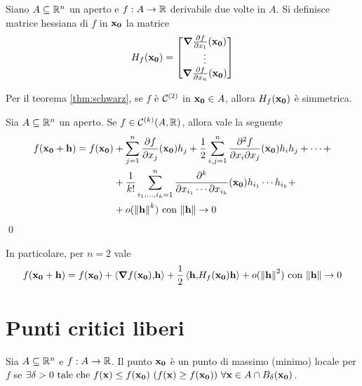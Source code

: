 \begin{definition}
    Siano $A \subseteq \mathbb{R}^n$ un aperto e $f: A \to \mathbb{R}$ derivabile due volte in $A$. Si definisce matrice hessiana di $f$ in $\vb{x_0}$ la matrice
    $$
        H_f(\vb{x_0}) =
        \begin{bmatrix}
            \grad \frac{\partial f}{\partial x_1}(\vb{x_0})\\
            \vdots\\
            \grad \frac{\partial f}{\partial x_n}(\vb{x_0})
        \end{bmatrix}
    $$
\end{definition}

\begin{remark}
    Per il teorema \ref{thm:schwarz}, se $f$ è $\mathcal{C}^{(2)}$ in $\vb{x_0} \in A$, allora $H_f(\vb{x_0})$ è simmetrica.
\end{remark}

\begin{theorem}
    Sia $A \subseteq \mathbb{R}^n$ un aperto. Se $f \in \mathcal{C}^{(k)}(A, \mathbb{R})$, allora vale la seguente
    \begin{align*}
        f(\vb{x_0}+ \vb{h})= f(\vb{x_0})&+\sum_{j=1}^{n}\frac{\partial f}{\partial x_j}(\vb{x_0})h_j + \frac{1}{2}\sum_{i,j=1}^{n}\frac{\partial^2 f}{\partial x_i \partial x_j}(\vb{x_0})h_ih_j+\cdots+\\
        &+\frac{1}{k!}\sum_{i_1,\dots,i_k=1}^n\frac{\partial^k}{\partial x_{i_1}\cdots\partial x_{i_k}}(\vb{x_0})h_{i_1}\cdots h_{i_k} +\\
        &+o (\norm{\vb{h}}^k) \text{ con } \norm{\vb{h}} \to 0
    \end{align*}
    \qed
\end{theorem}

\begin{remark}
    In particolare, per $n=2$ vale
    $$
        f(\vb{x_0} + \vb{h}) = f(\vb{x_0})+\left\langle\grad f(\vb{x_0}){,}\vb{h}\right\rangle + \frac{1}{2}\left\langle\vb{h}{,}H_f(\vb{x_0})\vb{h}\right\rangle+o(\norm{\vb{h}}^2) \text{ con } \norm{\vb{h}} \to 0
    $$
\end{remark}

\section{Punti critici liberi}

\begin{definition}
    \label{def:minmax}
    Sia $A \subseteq \mathbb{R}^n$ e $f: A \to \mathbb{R}$. Il punto $\vb{x_0}$ è un punto di massimo (minimo) locale per $f$ se $\exists \delta > 0 \text{ tale che } f(\vb{x}) \leq f(\vb{x_0})\ (f(\vb{x})\geq f(\vb{x_0})) \ \forall \vb{x} \in A \cap B_\delta (\vb{x_0})$.
\end{definition}

